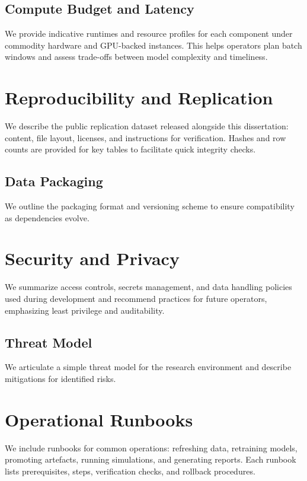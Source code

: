 \documentclass[12pt]{report}  %
\numberwithin{equation}{section}
\theoremstyle{plain}
\theoremstyle{definition}
\theoremstyle{remark}
\begin{document}
\section{Compute Budget and Latency}
We provide indicative runtimes and resource profiles for each component under commodity hardware and GPU-backed instances. This helps operators plan batch windows and assess trade-offs between model complexity and timeliness.


\chapter{Reproducibility and Replication}
We describe the public replication dataset released alongside this dissertation: content, file layout, licenses, and instructions for verification. Hashes and row counts are provided for key tables to facilitate quick integrity checks.

\section{Data Packaging}
We outline the packaging format and versioning scheme to ensure compatibility as dependencies evolve.

\chapter{Security and Privacy}
We summarize access controls, secrets management, and data handling policies used during development and recommend practices for future operators, emphasizing least privilege and auditability.

\section{Threat Model}
We articulate a simple threat model for the research environment and describe mitigations for identified risks.

\chapter{Operational Runbooks}
We include runbooks for common operations: refreshing data, retraining models, promoting artefacts, running simulations, and generating reports. Each runbook lists prerequisites, steps, verification checks, and rollback procedures.
\end{document}
